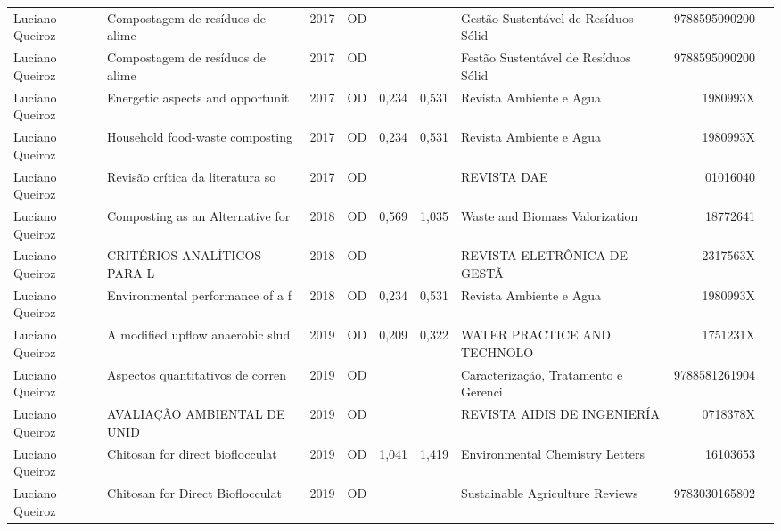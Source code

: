 \documentclass[12pt,brazil]{article}\usepackage[]{graphicx}\usepackage[]{xcolor}
\begin{document}
\begin{longtable}{lllrrllrr}
Luciano Queiroz & Compostagem de resíduos de alime & 2017 & OD &  &  & Gestão Sustentável de Resíduos Sólid & 9788595090200 \\
\rowcolor{duplic}\rowcolor{duplic}\rowcolor{duplic}\rowcolor{duplic}\rowcolor{duplic}\rowcolor{duplic}\rowcolor{duplic}\rowcolor{duplic}\rowcolor{duplic}\rowcolor{duplic}\rowcolor{duplic}\rowcolor{duplic}\rowcolor{duplic}\rowcolor{duplic}\rowcolor{duplic}\rowcolor{duplic}Luciano Queiroz & Compostagem de resíduos de alime & 2017 & OD &  &  & Festão Sustentável de Resíduos Sólid & 9788595090200 \\
Luciano Queiroz & Energetic aspects and opportunit & 2017 & OD & 0,234 & 0,531 & Revista Ambiente e Agua & 1980993X \\
Luciano Queiroz & Household food-waste composting  & 2017 & OD & 0,234 & 0,531 & Revista Ambiente e Agua & 1980993X \\
Luciano Queiroz & Revisão crítica da literatura so & 2017 & OD &  &  & REVISTA DAE & 01016040 \\
Luciano Queiroz & Composting as an Alternative for & 2018 & OD & 0,569 & 1,035 & Waste and Biomass Valorization & 18772641 \\
Luciano Queiroz & CRITÉRIOS ANALÍTICOS PARA L & 2018 & OD &  &  & REVISTA ELETRÔNICA DE GESTÃ & 2317563X \\
Luciano Queiroz & Environmental performance of a f & 2018 & OD & 0,234 & 0,531 & Revista Ambiente e Agua & 1980993X \\
Luciano Queiroz & A modified upflow anaerobic slud & 2019 & OD & 0,209 & 0,322 & WATER PRACTICE AND TECHNOLO & 1751231X \\
Luciano Queiroz & Aspectos quantitativos de corren & 2019 & OD &  &  & Caracterização, Tratamento e Gerenci & 9788581261904 \\
Luciano Queiroz & AVALIAÇÃO AMBIENTAL DE UNID & 2019 & OD &  &  & REVISTA AIDIS DE INGENIERÍA & 0718378X \\
Luciano Queiroz & Chitosan for direct bioflocculat & 2019 & OD & 1,041 & 1,419 & Environmental Chemistry Letters & 16103653 \\
\rowcolor{duplic}\rowcolor{duplic}\rowcolor{duplic}\rowcolor{duplic}\rowcolor{duplic}\rowcolor{duplic}\rowcolor{duplic}\rowcolor{duplic}\rowcolor{duplic}\rowcolor{duplic}\rowcolor{duplic}\rowcolor{duplic}\rowcolor{duplic}\rowcolor{duplic}\rowcolor{duplic}\rowcolor{duplic}Luciano Queiroz & Chitosan for Direct Bioflocculat & 2019 & OD &  &  & Sustainable Agriculture Reviews & 9783030165802 \\

\end{longtable}
\end{document}
